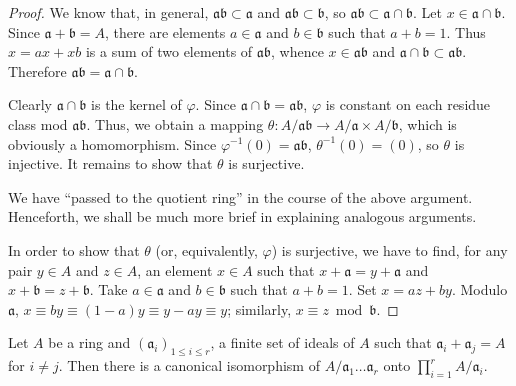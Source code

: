 \begin{proof}
We know that, in general, $\mathfrak{a}\mathfrak{b}\subset\mathfrak{a}$ and
$\mathfrak{a}\mathfrak{b}\subset\mathfrak{b}$, so
$\mathfrak{a}\mathfrak{b}\subset\mathfrak{a}\cap\mathfrak{b}$. Let
$x\in\mathfrak{a}\cap\mathfrak{b}$. Since $\mathfrak{a}+\mathfrak{b}=A$,
there are elements $a\in\mathfrak{a}$ and $b\in\mathfrak{b}$ such that
$a+b=1$. Thus $x=ax+xb$ is a sum of two elements of
$\mathfrak{a}\mathfrak{b}$, whence $x\in\mathfrak{a}\mathfrak{b}$ and
$\mathfrak{a}\cap\mathfrak{b}\subset\mathfrak{a}\mathfrak{b}$. Therefore
$\mathfrak{a}\mathfrak{b}=\mathfrak{a}\cap\mathfrak{b}$.

Clearly $\mathfrak{a}\cap\mathfrak{b}$ is the kernel of $\varphi$. Since
$\mathfrak{a}\cap\mathfrak{b}=\mathfrak{a}\mathfrak{b}$, $\varphi$ is
constant on each residue class mod $\mathfrak{a}\mathfrak{b}$. Thus, we
obtain a mapping
$\theta:A/\mathfrak{a}\mathfrak{b}\to A/\mathfrak{a}\times A/\mathfrak{b}$,
which is obviously a homomorphism. Since
$\varphi^{-1}(0)=\mathfrak{a}\mathfrak{b}$, $\theta^{-1}(0)=(0)$, so $\theta$
is injective. It remains to show that $\theta$ is surjective.

We have ``passed to the quotient ring'' in the course of the above
argument. Henceforth, we shall be much more brief in explaining analogous
arguments.

In order to show that $\theta$ (or, equivalently, $\varphi$) is surjective,
we have to find, for any pair $y\in A$ and $z\in A$, an element $x\in A$
such that $x+\mathfrak{a}=y+\mathfrak{a}$ and
$x+\mathfrak{b}=z+\mathfrak{b}$. Take $a\in\mathfrak{a}$ and
$b\in\mathfrak{b}$ such that $a+b=1$. Set $x=az+by$. Modulo
$\mathfrak{a}$, $x\equiv by\equiv(1-a)y\equiv y-ay\equiv y$; similarly,
$x\equiv z\bmod\mathfrak{b}$.
\end{proof}

\begin{lemma}
\label{lem:I.3.2}
Let $A$ be a ring and $(\mathfrak{a}_{i})_{1\leq i\leq r}$, a finite set of
ideals of $A$ such that
$\mathfrak{a}_{i}+\mathfrak{a}_{j}=A$ for $i\neq j$. Then there is a
canonical isomorphism of $A/\mathfrak{a}_{1}\ldots\mathfrak{a}_{r}$ onto
$\prod_{i=1}^{r}A/\mathfrak{a}_{i}$.
\end{lemma}

